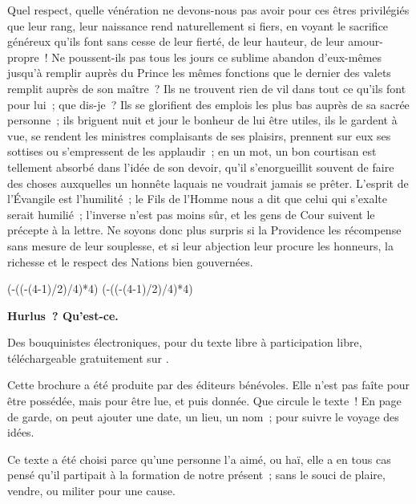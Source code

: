 \documentclass[french,twoside]{book} %
\def\truncdiv#1#2{((#1-(#2-1)/2)/#2)}
\def\moduloop#1#2{(#1-\truncdiv{#1}{#2}*#2)}
\def\modulo#1#2{\number\numexpr\moduloop{#1}{#2}\relax}
\begin{document}
Quel respect, quelle vénération ne devons-nous pas avoir pour ces êtres privilégiés que leur rang, leur naissance rend naturellement si fiers, en voyant le sacrifice généreux qu’ils font sans cesse de leur fierté, de leur hauteur, de leur amour-propre ! Ne poussent-ils pas tous les jours ce sublime abandon d’eux-mêmes jusqu’à remplir auprès du Prince les mêmes fonctions que le dernier des valets remplit auprès de son maître ? Ils ne trouvent rien de vil dans tout ce qu’ils font pour lui ; que dis-je ? Ils se glorifient des emplois les plus bas auprès de sa sacrée personne ; ils briguent nuit et jour le bonheur de lui être utiles, ils le gardent à vue, se rendent les ministres complaisants de ses plaisirs, prennent sur eux ses sottises ou s’empressent de les applaudir ; en un mot, un bon courtisan est tellement absorbé dans l’idée de son devoir, qu’il s’enorgueillit souvent de faire des choses auxquelles un honnête laquais ne voudrait jamais se prêter. L’esprit de l’Évangile est l’humilité ; le Fils de l’Homme nous a dit que celui qui s’exalte serait humilié ; l’inverse n’est pas moins sûr, et les gens de Cour suivent le précepte à la lettre. Ne soyons donc plus surpris si la Providence les récompense sans mesure de leur souplesse, et si leur abjection leur procure les honneurs, la richesse et le respect des Nations bien gouvernées.\par
\bigbreak
 


\ifbooklet
  \pagestyle{empty}
  \clearpage
  \ifnum\modulo{\value{page}}{4}=0 \hbox{}\newpage\hbox{}\newpage\fi
  \ifnum\modulo{\value{page}}{4}=1 \hbox{}\newpage\hbox{}\newpage\fi


  \hbox{}\newpage
  \ifodd\value{page}\hbox{}\newpage\fi
  {\centering\color{rubric}\bfseries\noindent\large
    Hurlus ? Qu’est-ce.\par
    \bigskip
  }
  \noindent Des bouquinistes électroniques, pour du texte libre à participation libre,
  téléchargeable gratuitement sur \href{https://hurlus.fr}{}.\par
  \bigskip
  \noindent Cette brochure a été produite par des éditeurs bénévoles.
  Elle n’est pas faîte pour être possédée, mais pour être lue, et puis donnée.
  Que circule le texte !
  En page de garde, on peut ajouter une date, un lieu, un nom ; pour suivre le voyage des idées.
  \par

  Ce texte a été choisi parce qu’une personne l’a aimé,
  ou haï, elle a en tous cas pensé qu’il partipait à la formation de notre présent ;
  sans le souci de plaire, vendre, ou militer pour une cause.
  \par
\end{document}
